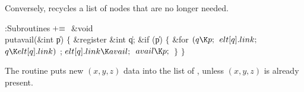 Conversely,  recycles a list of nodes that are no longer
needed.

\Y\B\4:Subroutines\X${}\mathrel+\equiv{}$\6
\&{void} \\{putavail}(\&{int} \|p)\1\1\2\2\6
${}\{{}$\1\6
\&{register} \&{int} \|q;\7
\&{if} (\|p)\5
${}\{{}$\1\6
\&{for} ${}(\|q\K\|p;{}$ ${}\\{elt}[\|q].\\{link};{}$ ${}\|q\K\\{elt}[\|q].%
\\{link}){}$\1\5
;\2\6
${}\\{elt}[\|q].\\{link}\K\\{avail};{}$\6
${}\\{avail}\K\|p;{}$\6
\4${}\}{}$\2\6
\4${}\}{}$\2\par
\fi

The  routine puts new $(x,y,z)$ data into the list of ,
unless $(x,y,z)$ is already present.

